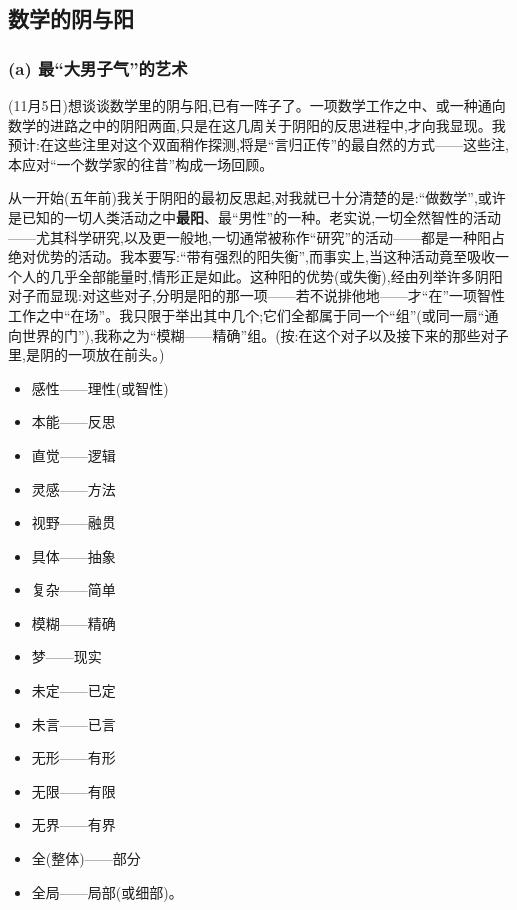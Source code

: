 \subsection{数学的阴与阳}
\label{ch18:local:h26}

\subsubsection*{(a) 最“大男子气”的艺术}
\label{ch18:local:h27}

\label{ch18:local:n23}

(11月5日)想谈谈数学里的阴与阳,已有一阵子了。一项数学工作之中、或一种通向数学的进路之中的阴阳两面,只是在这几周关于阴阳的反思进程中,才向我显现。我预计:在这些注里对这个双面稍作探测,将是“言归正传”的最自然的方式——这些注,本应对“一个数学家的往昔”构成一场回顾。

从一开始(五年前)我关于阴阳的最初反思起,对我就已十分清楚的是:“做数学”,或许是已知的一切人类活动之中\textbf{最阳}、最“男性”的一种。老实说,一切全然智性的活动——尤其科学研究,以及更一般地,一切通常被称作“研究”的活动——都是一种阳占绝对优势的活动。我本要写:“带有强烈的阳失衡”,而事实上,当这种活动竟至吸收一个人的几乎全部能量时,情形正是如此。这种阳的优势(或失衡),经由列举许多阴阳对子而显现:对这些对子,分明是阳的那一项——若不说排他地——才“在”一项智性工作之中“在场”。我只限于举出其中几个;它们全都属于同一个“组”(或同一扇“通向世界的门”),我称之为“模糊——精确”组。(按:在这个对子以及接下来的那些对子里,是阴的一项放在前头。)

\begin{itemize}
\setlength{\itemsep}{0pt}
\setlength{\parsep}{0pt}
\item 感性——理性(或智性)
\item 本能——反思
\item 直觉——逻辑
\item 灵感——方法
\item \dmark{}视野——融贯
\item 具体——抽象
\item 复杂——简单
\item 模糊——精确
\item 梦——现实
\item 未定——已定
\item 未言——已言
\item 无形——有形
\item 无限——有限
\item 无界——有界
\item 全(整体)——部分
\item 全局——局部(或细部)。
\end{itemize}

